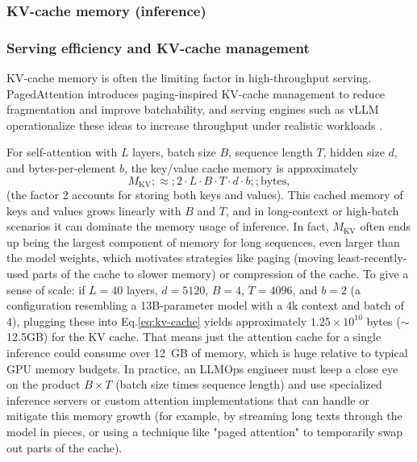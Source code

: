 \subsubsection{KV-cache memory (inference)}

\subsubsection{Serving efficiency and KV-cache management}
KV-cache memory is often the limiting factor in high-throughput serving. PagedAttention introduces paging-inspired
KV-cache management to reduce fragmentation and improve batchability, and serving engines such as vLLM operationalize
these ideas to increase throughput under realistic workloads \cite{Kwon2023vLLM}.

For self-attention with $L$ layers, batch size $B$, sequence length $T$, hidden size $d$, and bytes-per-element $b$, the key/value cache memory is approximately
\begin{equation}
\label{eq:kv-cache}
M_{\text{KV}} ;\approx; 2 \cdot L \cdot B \cdot T \cdot d \cdot b ;; \text{bytes},
\end{equation}
(the factor 2 accounts for storing both keys and values). This cached memory of keys and values grows linearly with $B$ and $T$, and in long-context or high-batch scenarios it can dominate the memory usage of inference. In fact, $M_{\text{KV}}$ often ends up being the largest component of memory for long sequences, even larger than the model weights, which motivates strategies like paging (moving least-recently-used parts of the cache to slower memory) or compression of the cache. To give a sense of scale: if $L=40$ layers, $d=5120$, $B=4$, $T=4096$, and $b=2$ (a configuration resembling a 13B-parameter model with a 4k context and batch of 4), plugging these into Eq.\ref{eq:kv-cache} yields approximately $1.25 \times 10^{10}$ bytes ($\sim$12.5GB) for the KV cache. That means just the attention cache for a single inference could consume over 12~GB of memory, which is huge relative to typical GPU memory budgets. In practice, an LLMOps engineer must keep a close eye on the product $B \times T$ (batch size times sequence length) and use specialized inference servers or custom attention implementations that can handle or mitigate this memory growth (for example, by streaming long texts through the model in pieces, or using a technique like "paged attention" to temporarily swap out parts of the cache).

